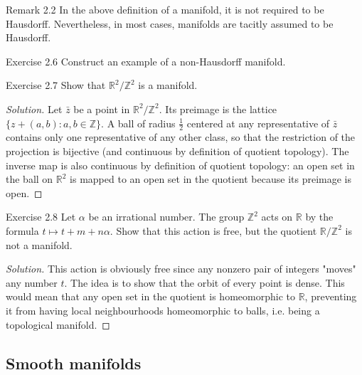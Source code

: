 \begin{thing5}{Remark 2.2}\leavevmode
	In the above definition of a manifold, it is not required to be Hausdorff. Nevertheless, in most cases, manifolds are tacitly assumed to be Hausdorff.
\end{thing5}

\begin{thing4}{Exercise 2.6}\label{exer:2.6}\leavevmode
Construct an example of a non-Hausdorff manifold.
\end{thing4}

\begin{thing4}{Exercise 2.7}\label{exer:2.7}\leavevmode
Show that $\mathbb{R}^2/\mathbb{Z}^2$ is a manifold.
\end{thing4}

\begin{proof}[Solution]\leavevmode
Let $\bar{z}$ be a point in $\mathbb{R}^2/\mathbb{Z}^2$. Its preimage is the lattice $\{z+(a,b):a,b \in \mathbb{Z}\}$. A ball of radius  $\frac{1}{2}$ centered at any representative of $\bar{z} $ contains only one representative of any other class, so that the restriction of the projection is bijective (and continuous by definition of quotient topology). The inverse map is also continuous by definition of quotient topology: an open set in the ball on $\mathbb{R}^2$ is mapped to an open set in the quotient because its preimage is open.
\end{proof}

\begin{thing4}{Exercise 2.8}\label{exer:2.8}\leavevmode
Let $\alpha$ be an irrational number. The group $\mathbb{Z}^2$ acts on $\mathbb{R}$ by the formula $t \mapsto  t +m +n\alpha$. Show that this action is free, but the quotient $\mathbb{R}/\mathbb{Z}^2$ is not a manifold.
\end{thing4}

\begin{proof}[Solution]\leavevmode
This action is obviously free since any nonzero pair of integers "moves" any number $t$. The idea is to show that the orbit of every point is dense. This would mean that any open set in the quotient is homeomorphic to $\mathbb{R}$, preventing it from having local neighbourhoods homeomorphic to balls, i.e. being a topological manifold.
\end{proof}

\subsection{Smooth manifolds}

